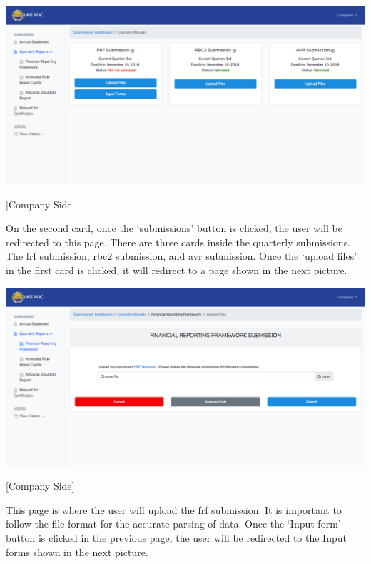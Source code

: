 \documentclass{article}
\begin{document}
\noindent{}\includegraphics[keepaspectratio=true]{up-ic-screens/image112}{}%

[Company Side]%

On the second card, once the ‘submissions’ button is
clicked, the user will be redirected to this page. There are three cards
inside the quarterly submissions. The frf
submission, rbc2 submission, and avr submission. Once the ‘upload files’ in the first card is clicked, it
will redirect to a page shown in the next picture.%

\includegraphics[keepaspectratio=true]{up-ic-screens/image200}{}%

[Company Side]%

This page is where the user will upload the frf
submission. It is important to follow the file format for the accurate
parsing of data. Once the ‘Input form’ button is clicked in the previous
page, the user will be redirected to the Input forms shown in the next
picture.%
\end{document}
